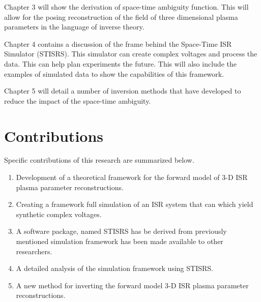 Chapter 3 will show the derivation of space-time ambiguity function. This will allow for the posing reconstruction of the field of three dimensional plasma parameters in the language of inverse theory. 

Chapter 4 contains a discussion of the frame behind the Space-Time ISR Simulator (STISRS). This simulator can create complex voltages and process the data. This can help plan experiments the future. This will also include the examples of simulated data to show the capabilities of this framework.

Chapter 5 will detail a number of inversion methods that have developed to reduce the impact of the space-time ambiguity. 

\section{Contributions}
Specific contributions of this research are summarized below.

\begin{enumerate}
\item Development of a theoretical framework for the forward model of 3-D ISR plasma parameter reconstructions.
\item Creating a framework full simulation of an ISR system that can which yield synthetic complex voltages.
\item A software package, named STISRS has be derived from previously mentioned simulation framework has been made available to other researchers.
\item A detailed analysis of the simulation framework using STISRS.
\item A new method for inverting the forward model 3-D ISR plasma parameter reconstructions.
\end{enumerate}